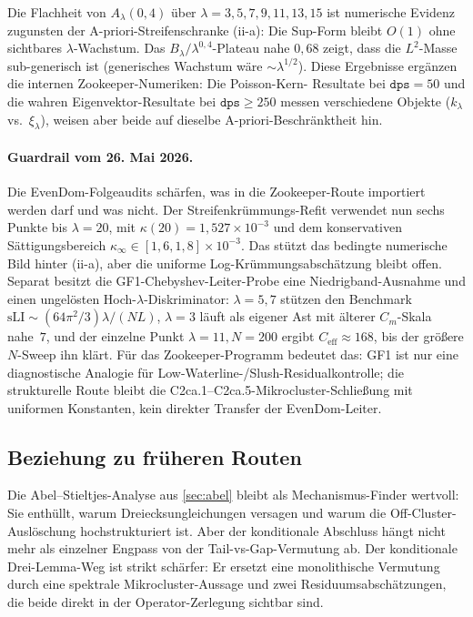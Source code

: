 \documentclass[12pt,a4paper]{article}
\theoremstyle{definition}
\theoremstyle{remark}
\begin{document}
Die Flachheit von $A_\lambda(0{,}4)$ über $\lambda = 3, 5, 7, 9, 11, 13, 15$ ist
numerische Evidenz zugunsten der A-priori-Streifenschranke (ii-a):
Die Sup-Form bleibt $O(1)$ ohne sichtbares $\lambda$-Wachstum.
Das $B_\lambda/\lambda^{0{,}4}$-Plateau nahe $0{,}68$ zeigt, dass die
$L^2$-Masse sub-generisch ist (generisches Wachstum wäre $\sim\lambda^{1/2}$).
Diese Ergebnisse ergänzen die internen Zookeeper-Numeriken: Die Poisson-Kern-
Resultate bei $\mathtt{dps}=50$ und die wahren Eigenvektor-Resultate bei
$\mathtt{dps}\ge 250$ messen verschiedene Objekte ($k_\lambda$ vs.\
$\xi_\lambda$), weisen aber beide auf dieselbe A-priori-Beschränktheit hin.

\paragraph{Guardrail vom 26. Mai 2026.}
Die EvenDom-Folgeaudits schärfen, was in die Zookeeper-Route importiert
werden darf und was nicht. Der Streifenkrümmungs-Refit verwendet nun sechs
Punkte bis $\lambda=20$, mit $\kappa(20)=1{,}527\times10^{-3}$ und dem
konservativen Sättigungsbereich $\kappa_\infty\in[1{,}6,1{,}8]\times10^{-3}$.
Das stützt das bedingte numerische Bild hinter (ii-a), aber die uniforme
Log-Krümmungsabschätzung bleibt offen. Separat besitzt die
GF1-Chebyshev-Leiter-Probe eine Niedrigband-Ausnahme und einen
ungelösten Hoch-$\lambda$-Diskriminator: $\lambda=5,7$ stützen den
Benchmark $\mathrm{sLI}\sim(64\pi^2/3)\lambda/(NL)$, $\lambda=3$ läuft
als eigener Ast mit älterer $C_m$-Skala nahe~$7$, und der einzelne Punkt
$\lambda=11,N=200$ ergibt $C_{\mathrm{eff}}\approx168$, bis der größere
$N$-Sweep ihn klärt. Für das Zookeeper-Programm bedeutet das: GF1 ist nur
eine diagnostische Analogie für Low-Waterline-/Slush-Residualkontrolle;
die strukturelle Route bleibt die C2ca.1--C2ca.5-Mikrocluster-Schließung
mit uniformen Konstanten, kein direkter Transfer der EvenDom-Leiter.

\subsection{Beziehung zu früheren Routen}

Die Abel--Stieltjes-Analyse aus \cref{sec:abel} bleibt als Mechanismus-Finder
wertvoll: Sie enthüllt, warum Dreiecksungleichungen versagen und warum die
Off-Cluster-Auslöschung hochstrukturiert ist. Aber der konditionale
Abschluss hängt nicht mehr als einzelner Engpass von der
Tail-vs-Gap-Vermutung ab. Der konditionale Drei-Lemma-Weg ist strikt
schärfer: Er ersetzt eine monolithische Vermutung durch eine spektrale
Mikrocluster-Aussage und zwei Residuumsabschätzungen, die beide direkt in
der Operator-Zerlegung sichtbar sind.
\end{document}
